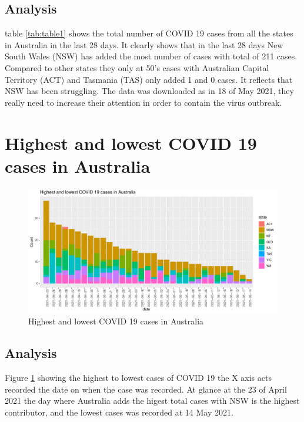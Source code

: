 \documentclass[11pt,a4paper,]{article}
\begin{document}
\hypertarget{analysis}{%
\subsection{Analysis}\label{analysis}}

table \ref{tab:table1} shows the total number of COVID 19 cases from all the states in Australia in the last 28 days. It clearly shows that in the last 28 days New South Wales (NSW) has added the most number of cases with total of 211 cases. Compared to other states they only at 50's cases with Australian Capital Territory (ACT) and Tasmania (TAS) only added 1 and 0 cases. It reflects that NSW has been struggling. The data was downloaded as in 18 of May 2021, they really need to increase their attention in order to contain the virus outbreak.

\hypertarget{highest-and-lowest-covid-19-cases-in-australia}{%
\section{Highest and lowest COVID 19 cases in Australia}\label{highest-and-lowest-covid-19-cases-in-australia}}

\begin{figure}
\centering
\includegraphics{report_files/figure-latex/figref1-1.pdf}
\caption{\label{fig:figref1}Highest and lowest COVID 19 cases in Australia}
\end{figure}

\hypertarget{analysis-1}{%
\subsection{Analysis}\label{analysis-1}}

Figure \ref{fig:figref1} showing the highest to lowest cases of COVID 19 the X axis acts recorded the date on when the case was recorded. At glance at the 23 of April 2021 the day where Australia adds the higest total cases with NSW is the highest contributor, and the lowest cases was recorded at 14 May 2021.
\end{document}
